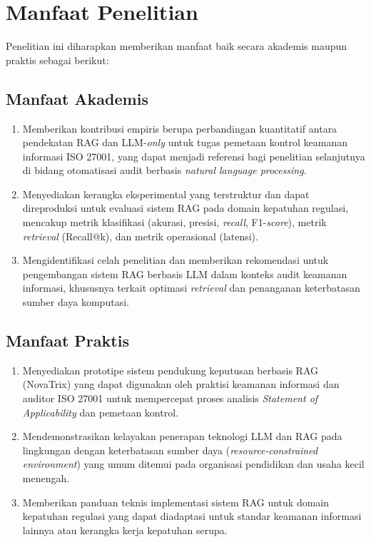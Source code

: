 \documentclass[bachelor,bahasa]{thesisdtetiugm}
\begin{document}
\section{Manfaat Penelitian}
\label{sec:manfaat-penelitian}

Penelitian ini diharapkan memberikan manfaat baik secara akademis maupun praktis sebagai berikut:

\subsection{Manfaat Akademis}

\begin{enumerate}
	\item Memberikan kontribusi empiris berupa perbandingan kuantitatif antara pendekatan RAG dan LLM-\textit{only} untuk tugas pemetaan kontrol keamanan informasi ISO 27001, yang dapat menjadi referensi bagi penelitian selanjutnya di bidang otomatisasi audit berbasis \textit{natural language processing}.
	
	\item Menyediakan kerangka eksperimental yang terstruktur dan dapat direproduksi untuk evaluasi sistem RAG pada domain kepatuhan regulasi, mencakup metrik klasifikasi (akurasi, presisi, \textit{recall}, F1-\textit{score}), metrik \textit{retrieval} (Recall@k), dan metrik operasional (latensi).
	
	\item Mengidentifikasi celah penelitian dan memberikan rekomendasi untuk pengembangan sistem RAG berbasis LLM dalam konteks audit keamanan informasi, khususnya terkait optimasi \textit{retrieval} dan penanganan keterbatasan sumber daya komputasi.
\end{enumerate}

\subsection{Manfaat Praktis}

\begin{enumerate}
	\item Menyediakan prototipe sistem pendukung keputusan berbasis RAG (NovaTrix) yang dapat digunakan oleh praktisi keamanan informasi dan auditor ISO 27001 untuk mempercepat proses analisis \textit{Statement of Applicability} dan pemetaan kontrol.
	
	\item Mendemonstrasikan kelayakan penerapan teknologi LLM dan RAG pada lingkungan dengan keterbatasan sumber daya (\textit{resource-constrained environment}) yang umum ditemui pada organisasi pendidikan dan usaha kecil menengah.
	
	\item Memberikan panduan teknis implementasi sistem RAG untuk domain kepatuhan regulasi yang dapat diadaptasi untuk standar keamanan informasi lainnya atau kerangka kerja kepatuhan serupa.
\end{enumerate}
\end{document}
